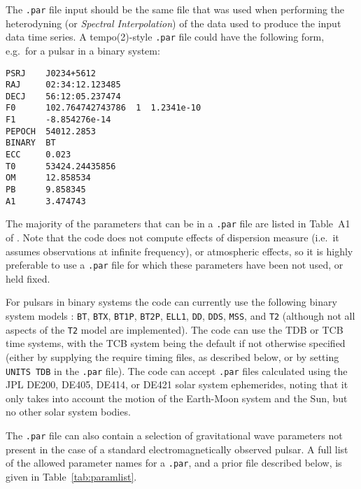 The {\tt .par} file input should be the same file that was used when performing the heterodyning (or {\it Spectral Interpolation})
of the data used to produce the input data time series. A {\sc tempo(2)}-style {\tt .par} file could have the following form, e.g.\
for a pulsar in a binary system:
\begin{verbatim}
PSRJ    J0234+5612
RAJ     02:34:12.123485
DECJ    56:12:05.237474
F0      102.764742743786  1  1.2341e-10
F1      -8.854276e-14
PEPOCH  54012.2853
BINARY  BT
ECC     0.023
T0      53424.24435856
OM      12.858534
PB      9.858345
A1      3.474743
\end{verbatim}

The majority of the parameters that can be in a {\tt .par} file are listed in Table~A1 of \citep{2006MNRAS.372.1549E}.
Note that the code does not compute effects of dispersion measure (i.e.\ it assumes observations at infinite frequency),
or atmospheric effects, so it is highly preferable to use a {\tt .par} file for which these parameters have been not
used, or held fixed.

For pulsars in binary systems the code can currently use the following binary system models \citep[see e.g.][for discussion
of some of the models]{1989ApJ...345..434T,2007PhRvD..76d2006P}: {\tt BT}, {\tt BTX},
{\tt BT1P}, {\tt BT2P}, {\tt ELL1}, {\tt DD}, {\tt DDS}, {\tt MSS}, and {\tt T2} (although not all aspects of the
{\tt T2} model are implemented). The code can use the TDB or TCB time systems, with the TCB system being the default if not otherwise
specified (either by supplying the require timing files, as described below, or by setting {\tt UNITS TDB} in the {\tt .par} file).
The code can accept {\tt .par} files calculated using the JPL DE200, DE405, DE414, or DE421 solar system ephemerides, noting
that it only takes into account the motion of the Earth-Moon system and the Sun, but no other solar system bodies.

The {\tt .par} file can also contain a selection of gravitational wave parameters not present in the case of a standard
electromagnetically observed pulsar. A full list of the allowed parameter names for a {\tt .par}, and a prior file described below,
is given in Table~\ref{tab:paramlist}.


